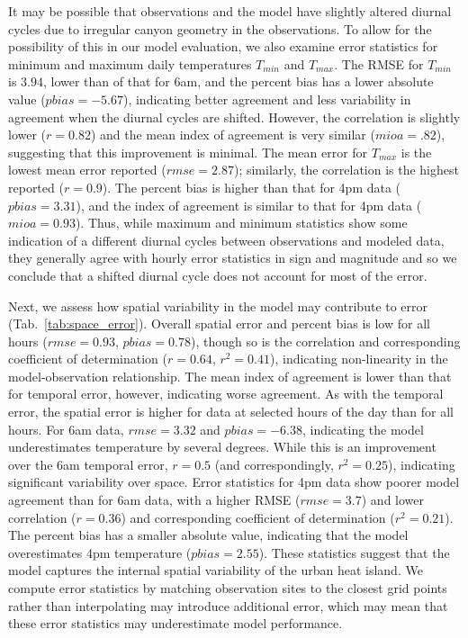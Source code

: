 \documentclass[draft,linenumbers]{agujournal}
\begin{document}
It may be possible that observations and the model have slightly altered diurnal cycles due to irregular canyon geometry in the observations. To allow for the possibility of this in our model evaluation, we also examine error statistics for minimum and maximum daily temperatures $T_{min}$ and $T_{max}$. The RMSE for $T_{min}$ is $3.94$, lower than of that for 6am, and the percent bias has a lower absolute value ($pbias=-5.67$), indicating better agreement and less variability in agreement when the diurnal cycles are shifted. However, the correlation is slightly lower ($r=0.82$) and the mean index of agreement is very similar ($mioa=.82$), suggesting that this improvement is minimal. The mean error for $T_{max}$ is the lowest mean error reported ($rmse=2.87$); similarly, the correlation is the highest reported ($r=0.9$). The percent bias is higher than that for 4pm data ($pbias=3.31$), and the index of agreement is similar to that for 4pm data ($mioa=0.93$).
Thus, while maximum and minimum statistics show some indication of a different diurnal cycles between observations and modeled data, they generally agree with hourly error statistics in sign and magnitude and so we conclude that a shifted diurnal cycle does not account for most of the error.

Next, we 
assess how spatial variability in the model may contribute to error (Tab.~\ref{tab:space_error}). Overall spatial error and percent bias is low for all hours ($rmse=0.93$, $pbias=0.78$), though so is the correlation and corresponding coefficient of determination ($r=0.64$, $r^2=0.41$), indicating non-linearity in the model-observation relationship. 
The mean index of agreement is lower than that for temporal error, however, indicating worse agreement. 
As with the temporal error, the spatial error is higher for data at selected hours of the day than for all hours. For 6am data, $rmse=3.32$ and $pbias=-6.38$, indicating the model underestimates temperature by several degrees. While this is an improvement over the 6am temporal error, $r=0.5$ (and correspondingly, $r^2 = 0.25$), indicating significant variability over space. Error statistics for 4pm data show poorer model agreement than for 6am data, with a higher RMSE ($rmse = 3.7$) and lower correlation ($r=0.36$) and corresponding coefficient of determination ($r^2 = 0.21$). The percent bias has a smaller absolute value, indicating that the model overestimates 4pm temperature ($pbias=2.55$). 
These statistics suggest that the model captures the internal spatial variability of the urban heat island.  We compute error statistics by matching observation sites to the closest grid points rather than interpolating may introduce additional error, which may mean that these error statistics may underestimate model performance.
\end{document}
